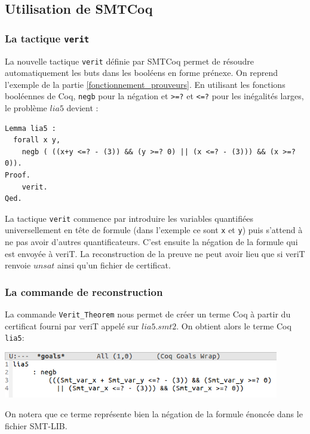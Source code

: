 \documentclass[11pt]{article}
\begin{document}
\subsection{Utilisation de SMTCoq}

\subsubsection{La tactique \texttt{verit}}

La nouvelle tactique \texttt{verit} définie par SMTCoq permet de résoudre automatiquement les buts dans les booléens en forme prénexe. On reprend l'exemple de la partie \ref{fonctionnement_prouveurs}. En utilisant les fonctions booléennes de Coq, \texttt{negb} pour la négation et \texttt{>=?} et \texttt{<=?} pour les inégalités larges, le problème $lia5$ devient :

\begin{lstlisting}[frame=single]
Lemma lia5 : 
  forall x y,
    negb ( ((x+y <=? - (3)) && (y >=? 0) || (x <=? - (3))) && (x >=? 0)).
Proof.
    verit.
Qed.
\end{lstlisting}

La tactique \texttt{verit} commence par introduire les variables quantifiées universellement en tête de formule (dans l'exemple ce sont \texttt{x} et \texttt{y}) puis s'attend à ne pas avoir d'autres quantificateurs. C'est ensuite la négation de la formule qui est envoyée à veriT. La reconstruction de la preuve ne peut avoir lieu que si veriT renvoie $unsat$ ainsi qu'un fichier de certificat.

\subsubsection{La commande de reconstruction}

La commande \texttt{Verit\_Theorem} nous permet de créer un terme Coq à partir du certificat fourni par veriT appelé sur $lia5.smt2$. On obtient alors le terme Coq \texttt{lia5}:

\includegraphics[height=2cm]{checklia5.png}

On notera que ce terme représente bien la négation de la formule énoncée dans le fichier SMT-LIB. 
\end{document}
